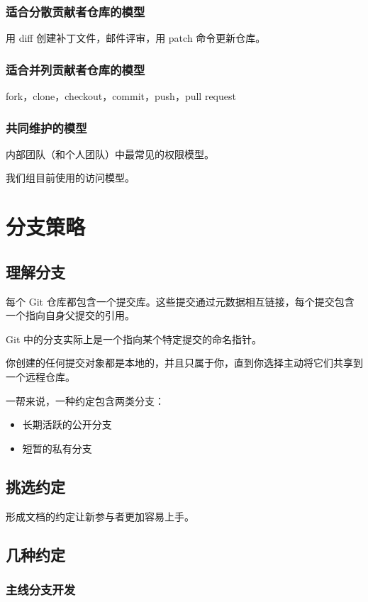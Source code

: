 \documentclass[cn,pad,11pt,green,geye]{../elegantnote}
\begin{document}
\subsubsection{适合分散贡献者仓库的模型}
用 diff 创建补丁文件，邮件评审，用 patch 命令更新仓库。

\subsubsection{适合并列贡献者仓库的模型}
fork，clone，checkout，commit，push，pull request

\subsubsection{共同维护的模型}
内部团队（和个人团队）中最常见的权限模型。

我们组目前使用的访问模型。

\section{分支策略}

\subsection{理解分支}
每个 Git 仓库都包含一个提交库。这些提交通过元数据相互链接，每个提交包含一个指向自身父提交的引用。

Git 中的分支实际上是一个指向某个特定提交的命名指针。

你创建的任何提交对象都是本地的，并且只属于你，直到你选择主动将它们共享到一个远程仓库。

一帮来说，一种约定包含两类分支：
\begin{itemize}
   \item 长期活跃的公开分支
   \item 短暂的私有分支
\end{itemize}

\subsection{挑选约定}
形成文档的约定让新参与者更加容易上手。

\subsection{几种约定}

\subsubsection{主线分支开发}
\end{document}
